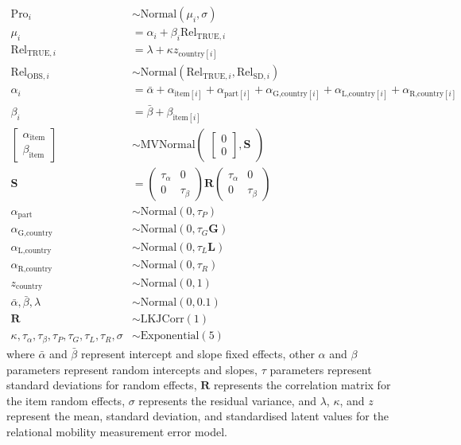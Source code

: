 \documentclass[
  man,floatsintext]{apa6}
\begin{document}
\[
\begin{aligned}
\text{Pro}_{i} &\sim \text{Normal}(\mu_{i},\sigma) \\
\mu_{i} &= \alpha_{i} + \beta_{i}\text{Rel}_{\text{TRUE},i} \\
\text{Rel}_{\text{TRUE},i} &= \lambda + \kappa z_{\text{country}[i]} \\
\text{Rel}_{\text{OBS},i} &\sim \text{Normal}(\text{Rel}_{\text{TRUE},i}, \text{Rel}_{\text{SD},i}) \\
\alpha_{i} &= \bar{\alpha} + \alpha_{\text{item}[i]} + \alpha_{\text{part}[i]} + \alpha_{\text{G,country}[i]} + \alpha_{\text{L,country}[i]} + \alpha_{\text{R,country}[i]} \\
\beta_{i} &= \bar{\beta} + \beta_{\text{item}[i]} \\
\begin{bmatrix}\alpha_{\text{item}}\\
\beta_{\text{item}}\end{bmatrix} &\sim \text{MVNormal}
\begin{pmatrix}\begin{bmatrix}0\\0\end{bmatrix},\textbf{S}
\end{pmatrix}\\
\textbf{S} &=
\begin{pmatrix}\tau_{\alpha}&0\\0&\tau_{\beta}\end{pmatrix}
\textbf{R}
\begin{pmatrix}\tau_{\alpha}&0\\0&\tau_{\beta}\end{pmatrix} \\
\alpha_{\text{part}} &\sim \text{Normal}(0, \tau_{P}) \\
\alpha_{\text{G,country}} &\sim \text{Normal}(0, \tau_{G} \textbf{G}) \\
\alpha_{\text{L,country}} &\sim \text{Normal}(0, \tau_{L} \textbf{L}) \\
\alpha_{\text{R,country}} &\sim \text{Normal}(0, \tau_{R}) \\
z_{\text{country}} &\sim \text{Normal}(0, 1)\\
\bar{\alpha},\bar{\beta},\lambda &\sim \text{Normal}(0, 0.1) \\
\textbf{R} &\sim \text{LKJCorr}(1)\\
\kappa,\tau_{\alpha},\tau_{\beta},\tau_{P},\tau_{G},\tau_{L},\tau_{R},\sigma &\sim \text{Exponential}(5)
\end{aligned}
\]
where \(\bar{\alpha}\) and \(\bar{\beta}\) represent intercept and slope fixed effects, other \(\alpha\) and \(\beta\) parameters represent random intercepts and slopes, \(\tau\) parameters represent standard deviations for random effects, \(\textbf{R}\) represents the correlation matrix for the item random effects, \(\sigma\) represents the residual variance, and \(\lambda\), \(\kappa\), and \(z\) represent the mean, standard deviation, and standardised latent values for the relational mobility measurement error model.
\end{document}
